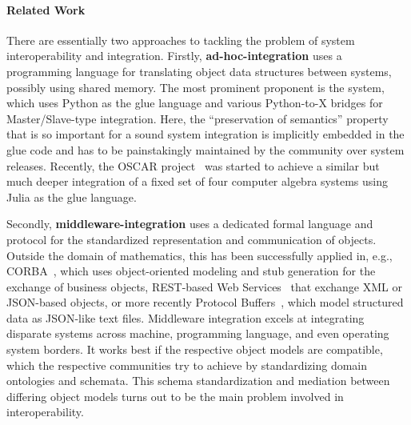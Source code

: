 \paragraph{Related Work}
There are essentially two approaches to tackling the problem of system interoperability and integration.
Firstly, \textbf{ad-hoc-integration} uses a programming language for translating object data structures between systems, possibly using shared memory.
The most prominent proponent is the \Sage system, which uses Python as the glue language and various Python-to-X bridges for Master/Slave-type integration.
Here, the ``preservation of semantics'' property that is so important for a sound system integration is implicitly embedded in the glue code and has to be painstakingly maintained by the community over system releases.
Recently, the OSCAR project~\cite{OSCAR:on} was started to achieve a similar but much deeper integration of a fixed set of four computer algebra systems using Julia as the glue language.

Secondly, \textbf{middleware-integration} uses a dedicated formal language and protocol for the standardized representation and communication of objects.
Outside the domain of mathematics, this has been successfully applied in, e.g., CORBA~\cite{Omg:Corba:Web}, which uses object-oriented modeling and stub generation for the exchange of business objects, REST-based Web Services~\cite{WSDL:on,Mitra:soapPrimer03} that exchange XML or JSON-based objects, or more recently Protocol Buffers~\cite{protobuffers:on}, which model structured data as JSON-like text files.
Middleware integration excels at integrating disparate systems across machine, programming language, and even operating system borders.
It works best if the respective object models are compatible, which the respective communities try to achieve by standardizing domain ontologies and schemata.
This schema standardization and mediation between differing object models turns out to be the main problem involved in interoperability.

